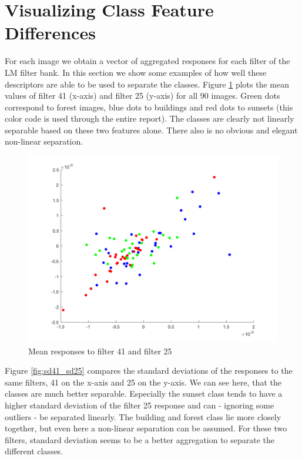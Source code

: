 \section{Visualizing Class Feature Differences}
\label{sec:vis1}

For each image we obtain a vector of aggregated responses for each filter of the LM filter bank. In this section we show some examples of how well these descriptors are able to be used to separate the classes.
Figure \ref{fig:m41_m25} plots the mean values of filter 41 (x-axis) and filter 25 (y-axis) for all 90 images. Green dots correspond to forest images, blue dots to buildings and red dots to sunsets (this color code is used through the entire report). The classes are clearly not linearly separable based on these two features alone. There also is no obvious and elegant non-linear separation. 

\begin{figure}[!hbt]
  \includegraphics[width=\textwidth]{img/m41_m25}
    \caption{Mean responses to filter 41 and filter 25}
  \label{fig:m41_m25}
\end{figure}

Figure \ref{fig:sd41_sd25} compares the standard deviations of the responses to the same filters, 41 on the x-axis and 25 on the y-axis. We can see here, that the classes are much better separable. Especially the sunset class tends to have a higher standard deviation of the filter 25 response and can - ignoring some outliers - be separated linearly. The building and forest class lie more closely together, but even here a non-linear separation can be assumed. For these two filters, standard deviation seems to be a better aggregation to separate the different classes.

